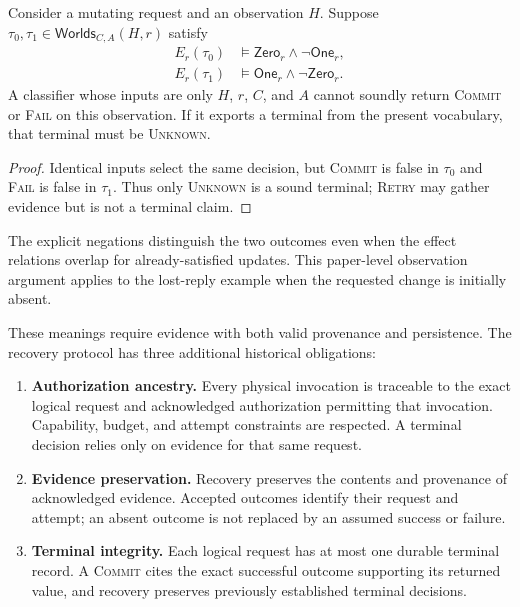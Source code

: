\documentclass[acmsmall,screen,review,anonymous]{acmart}
\newcommand{\Unknown}{\textsc{Unknown}\xspace}
\newcommand{\Commit}{\textsc{Commit}\xspace}
\newcommand{\Fail}{\textsc{Fail}\xspace}
\newcommand{\Retry}{\textsc{Retry}\xspace}
\begin{document}
\begin{proposition}
\label{prop:indistinguishable}
Consider a mutating request and an observation $H$. Suppose
$\tau_0,\tau_1\in\mathsf{Worlds}_{C,A}(H,r)$ satisfy
\[
\begin{aligned}
E_r(\tau_0)&\models\mathsf{Zero}_r\land\neg\mathsf{One}_r,\\
E_r(\tau_1)&\models\mathsf{One}_r\land\neg\mathsf{Zero}_r.
\end{aligned}
\]
A classifier whose inputs are only $H$, $r$, $C$, and $A$ cannot
soundly return \Commit or \Fail on this observation. If it exports a
terminal from the present vocabulary, that terminal must be \Unknown.
\end{proposition}
\begin{proof}
Identical inputs select the same decision, but \Commit is false in
$\tau_0$ and \Fail is false in $\tau_1$. Thus only \Unknown is a
sound terminal; \Retry may gather evidence but is not a terminal claim.
\end{proof}

The explicit negations distinguish the two outcomes even when the effect
relations overlap for already-satisfied updates. This paper-level observation
argument applies to the lost-reply example when the requested change is
initially absent.

These meanings require evidence with both valid provenance and
persistence. The recovery protocol has three additional historical
obligations:
\begin{enumerate}
  \item \textbf{Authorization ancestry.}
  Every physical invocation is traceable to the exact logical
  request and acknowledged authorization permitting that invocation.
  Capability, budget, and attempt constraints are respected.
  A terminal decision relies only on evidence for that same request.

  \item \textbf{Evidence preservation.}
  Recovery preserves the contents and provenance of acknowledged
  evidence. Accepted outcomes identify their request and attempt;
  an absent outcome is not replaced by an assumed success or failure.

  \item \textbf{Terminal integrity.}
  Each logical request has at most one durable terminal record.
  A \Commit cites the exact successful outcome supporting its
  returned value, and recovery preserves previously established
  terminal decisions.
\end{enumerate}
\end{document}

